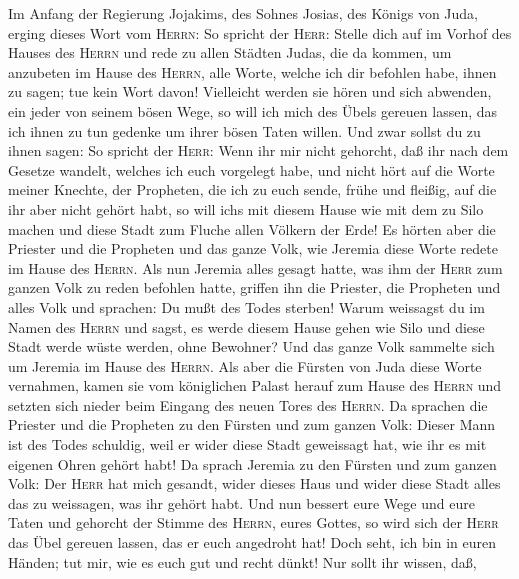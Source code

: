  Im Anfang der Regierung Jojakims, des Sohnes Josias, des
Königs von Juda, erging dieses Wort vom \textsc{Herrn}: 
So spricht der \textsc{Herr}: Stelle dich auf im Vorhof des Hauses des
\textsc{Herrn} und rede zu allen Städten Judas, die da kommen, um
anzubeten im Hause des \textsc{Herrn}, alle Worte, welche ich dir
befohlen habe, ihnen zu sagen; tue kein Wort davon! 
Vielleicht werden sie hören und sich abwenden, ein jeder von seinem
bösen Wege, so will ich mich des Übels gereuen lassen, das ich ihnen zu
tun gedenke um ihrer bösen Taten willen.  Und zwar sollst
du zu ihnen sagen: So spricht der \textsc{Herr}: Wenn ihr mir nicht
gehorcht, daß ihr nach dem Gesetze wandelt, welches ich euch vorgelegt
habe,  und nicht hört auf die Worte meiner Knechte, der
Propheten, die ich zu euch sende, frühe und fleißig, auf die ihr aber
nicht gehört habt,  so will ich\textquotesingle s mit
diesem Hause wie mit dem zu Silo machen und diese Stadt zum Fluche allen
Völkern der Erde!  Es hörten aber die Priester und die
Propheten und das ganze Volk, wie Jeremia diese Worte redete im Hause
des \textsc{Herrn}.  Als nun Jeremia alles gesagt hatte,
was ihm der \textsc{Herr} zum ganzen Volk zu reden befohlen hatte,
griffen ihn die Priester, die Propheten und alles Volk und sprachen: Du
mußt des Todes sterben!  Warum weissagst du im Namen des
\textsc{Herrn} und sagst, es werde diesem Hause gehen wie Silo und diese
Stadt werde wüste werden, ohne Bewohner? Und das ganze Volk sammelte
sich um Jeremia im Hause des \textsc{Herrn}.  Als aber
die Fürsten von Juda diese Worte vernahmen, kamen sie vom königlichen
Palast herauf zum Hause des \textsc{Herrn} und setzten sich nieder beim
Eingang des neuen Tores des \textsc{Herrn}.  Da sprachen
die Priester und die Propheten zu den Fürsten und zum ganzen Volk:
Dieser Mann ist des Todes schuldig, weil er wider diese Stadt geweissagt
hat, wie ihr es mit eigenen Ohren gehört habt!  Da sprach
Jeremia zu den Fürsten und zum ganzen Volk: Der \textsc{Herr} hat mich
gesandt, wider dieses Haus und wider diese Stadt alles das zu weissagen,
was ihr gehört habt.  Und nun bessert eure Wege und eure
Taten und gehorcht der Stimme des \textsc{Herrn}, eures Gottes, so wird
sich der \textsc{Herr} das Übel gereuen lassen, das er euch angedroht
hat!  Doch seht, ich bin in euren Händen; tut mir, wie es
euch gut und recht dünkt!  Nur sollt ihr wissen, daß,
